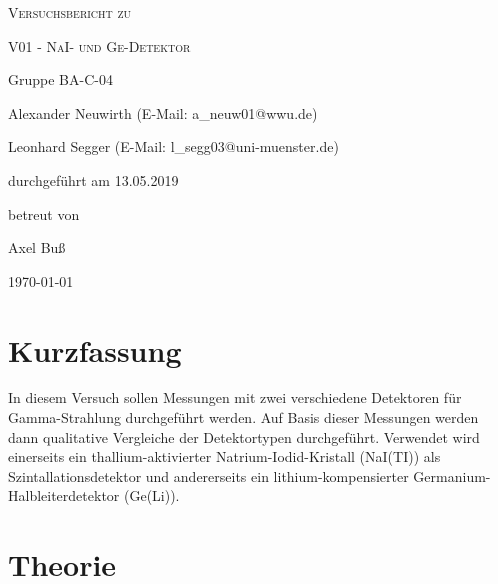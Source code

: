 \documentclass[
	a4paper,
	12pt,
	pagesize,
	ngerman
]{scrartcl}
\begin{document}
	\begin{titlepage}
		\centering
		{\scshape\LARGE Versuchsbericht zu \par}
		\vspace{1cm}
		{\scshape\huge V01 - NaI- und Ge-Detektor \par}
		\vspace{2.5cm}
		{\LARGE Gruppe BA-C-04 \par}
		\vspace{0.5cm}

		{\large Alexander Neuwirth (E-Mail: a\_neuw01@wwu.de) \par}
		{\large Leonhard Segger (E-Mail: l\_segg03@uni-muenster.de) \par}
		\vfill

		durchgeführt am 13.05.2019\par
		betreut von\par
		{\large Axel Buß}

		\vfill

		{\large \today\par}
	\end{titlepage}
	\tableofcontents
	\newpage

	\section{Kurzfassung}
	In diesem Versuch sollen Messungen mit zwei verschiedene Detektoren für Gamma-Strahlung durchgeführt werden.
	Auf Basis dieser Messungen werden dann qualitative Vergleiche der Detektortypen durchgeführt.
	Verwendet wird einerseits ein thallium-aktivierter Natrium-Iodid-Kristall (NaI(TI)) als Szintallationsdetektor und andererseits ein lithium-kompensierter Germanium-Halbleiterdetektor (Ge(Li)).


  \section{Theorie}

\end{document}
